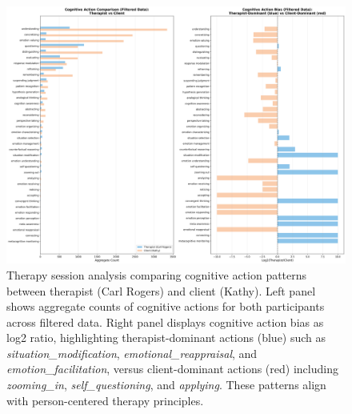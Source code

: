 \documentclass[letterpaper]{article}
\begin{document}
\begin{figure}[t]
\centering
\includegraphics[width=\textwidth]{../Keep_viz/rogers_kathy_comparison.png}
\caption{Therapy session analysis comparing cognitive action patterns between therapist (Carl Rogers) and client (Kathy). Left panel shows aggregate counts of cognitive actions for both participants across filtered data. Right panel displays cognitive action bias as log2 ratio, highlighting therapist-dominant actions (blue) such as \textit{situation\_modification}, \textit{emotional\_reappraisal}, and \textit{emotion\_facilitation}, versus client-dominant actions (red) including \textit{zooming\_in}, \textit{self\_questioning}, and \textit{applying}. These patterns align with person-centered therapy principles.}
\label{fig:therapy_comparison}
\end{figure}
\end{document}
